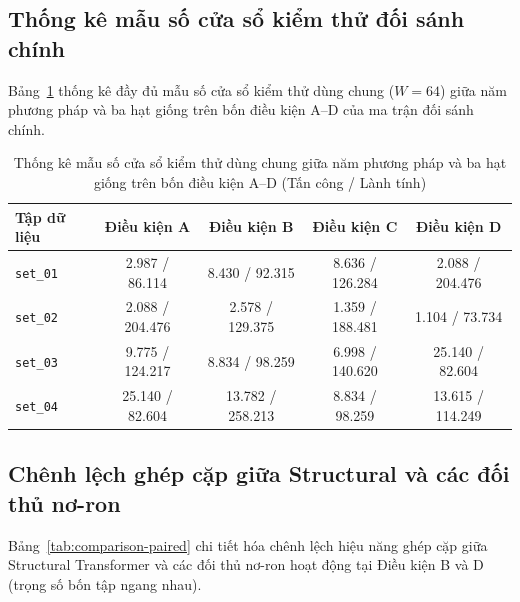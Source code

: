 \documentclass[12pt, a4paper, reqno, oneside]{book}
\DeclareRobustCommand{\code}[1]{\nolinkurl{#1}}
\begin{document}
\subsection{Thống kê mẫu số cửa sổ kiểm thử đối sánh chính}\label{subsec:app-counts}

Bảng~\ref{tab:comparison-counts} thống kê đầy đủ mẫu số cửa sổ kiểm thử dùng chung ($W=64$) giữa năm phương pháp và ba hạt giống trên bốn điều kiện A--D của ma trận đối sánh chính.

\begin{table}[htbp]
\centering
\small
\caption{Thống kê mẫu số cửa sổ kiểm thử dùng chung giữa năm phương pháp và ba hạt giống trên bốn điều kiện A--D (Tấn công / Lành tính)}\label{tab:comparison-counts}
\vspace{2pt}
\begin{tabular}{lcccc}
\toprule
\textbf{Tập dữ liệu} & \textbf{Điều kiện A} & \textbf{Điều kiện B} & \textbf{Điều kiện C} & \textbf{Điều kiện D} \\
\midrule
\code{set\_01} & 2.987 / 86.114 & 8.430 / 92.315 & 8.636 / 126.284 & 2.088 / 204.476 \\
\code{set\_02} & 2.088 / 204.476 & 2.578 / 129.375 & 1.359 / 188.481 & 1.104 / 73.734 \\
\code{set\_03} & 9.775 / 124.217 & 8.834 / 98.259 & 6.998 / 140.620 & 25.140 / 82.604 \\
\code{set\_04} & 25.140 / 82.604 & 13.782 / 258.213 & 8.834 / 98.259 & 13.615 / 114.249 \\
\bottomrule
\end{tabular}
\end{table}

\subsection{Chênh lệch ghép cặp giữa Structural và các đối thủ nơ-ron}\label{subsec:app-comparison-paired}
Bảng~\ref{tab:comparison-paired} chi tiết hóa chênh lệch hiệu năng ghép cặp giữa Structural Transformer và các đối thủ nơ-ron hoạt động tại Điều kiện B và D (trọng số bốn tập ngang nhau).
\end{document}
